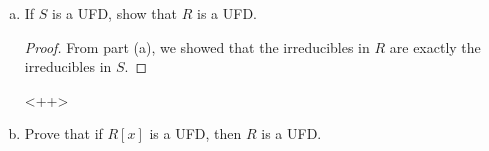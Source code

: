 \documentclass{article}
\begin{document}
\begin{itemize}
\begin{enumerate}[(a)]
\begin{proof}
					For the reverse direction, we prove the contrapositive. Suppose $p=ab$ is a nontrivial factorization in $S.$ By (2), since $p\in R$ and $a\mid p$ and $b\mid p,$ it follows that $a, b\in R,$ so $p$ has a nontrivial factorization in $R.$
				\end{proof}

			\item If $S$ is a UFD, show that $R$ is a UFD.
				\begin{proof}
					From part (a), we showed that the irreducibles in $R$ are exactly the irreducibles in $S.$ 
				\end{proof}<++>

			\item Prove that if $R[x]$ is a UFD, then $R$ is a UFD.
				
		\end{enumerate}
		
\end{itemize}
\end{document}
